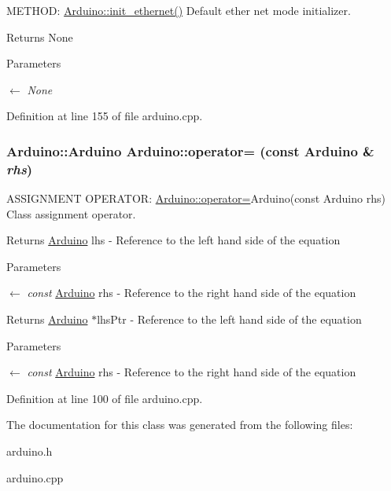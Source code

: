 METHOD: \hyperlink{classArduino_a1839d0c9bcb7c8b7f3fef2d8ac9eaad0_a1839d0c9bcb7c8b7f3fef2d8ac9eaad0}{Arduino::init\_\-ethernet()} Default ether net mode initializer. \begin{DoxyReturn}{Returns}
None 
\end{DoxyReturn}

\begin{DoxyParams}{Parameters}
\item[\mbox{$\leftarrow$} {\em None}]\end{DoxyParams}


Definition at line 155 of file arduino.cpp.\hypertarget{classArduino_af5f8c01c5fdf577706d231b56e060951_af5f8c01c5fdf577706d231b56e060951}{
\subsubsection[{operator=}]{\setlength{\rightskip}{0pt plus 5cm}Arduino::Arduino Arduino::operator= (const {\bf Arduino} \& {\em rhs})}}
\label{classArduino_af5f8c01c5fdf577706d231b56e060951_af5f8c01c5fdf577706d231b56e060951}


ASSIGNMENT OPERATOR: \hyperlink{classArduino_af5f8c01c5fdf577706d231b56e060951_af5f8c01c5fdf577706d231b56e060951}{Arduino::operator=}Arduino(const Arduino rhs) Class assignment operator. \begin{DoxyReturn}{Returns}
\hyperlink{classArduino}{Arduino} lhs -\/ Reference to the left hand side of the equation 
\end{DoxyReturn}

\begin{DoxyParams}{Parameters}
\item[\mbox{$\leftarrow$} {\em const}]\hyperlink{classArduino}{Arduino} rhs -\/ Reference to the right hand side of the equation\end{DoxyParams}
\begin{DoxyReturn}{Returns}
\hyperlink{classArduino}{Arduino} $\ast$lhsPtr -\/ Reference to the left hand side of the equation 
\end{DoxyReturn}

\begin{DoxyParams}{Parameters}
\item[\mbox{$\leftarrow$} {\em const}]\hyperlink{classArduino}{Arduino} rhs -\/ Reference to the right hand side of the equation \end{DoxyParams}


Definition at line 100 of file arduino.cpp.

The documentation for this class was generated from the following files:\begin{DoxyCompactItemize}
\item 
arduino.h\item 
arduino.cpp\end{DoxyCompactItemize}

